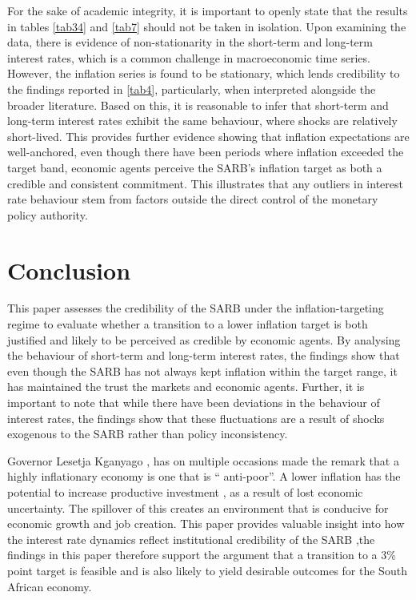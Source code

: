 \documentclass[11pt,preprint]{elsarticle}
\numberwithin{equation}{section}
\numberwithin{figure}{section}
\numberwithin{table}{section}
\begin{document}
For the sake of academic integrity, it is important to openly state that
the results in tables \ref{tab34} and \ref{tab7} should not be taken in
isolation. Upon examining the data, there is evidence of
non-stationarity in the short-term and long-term interest rates, which
is a common challenge in macroeconomic time series. However, the
inflation series is found to be stationary, which lends credibility to
the findings reported in \ref{tab4}, particularly, when interpreted
alongside the broader literature. Based on this, it is reasonable to
infer that short-term and long-term interest rates exhibit the same
behaviour, where shocks are relatively short-lived. This provides
further evidence showing that inflation expectations are well-anchored,
even though there have been periods where inflation exceeded the target
band, economic agents perceive the SARB's inflation target as both a
credible and consistent commitment. This illustrates that any outliers
in interest rate behaviour stem from factors outside the direct control
of the monetary policy authority.

\section{Conclusion}\label{conclusion}

This paper assesses the credibility of the SARB under the
inflation-targeting regime to evaluate whether a transition to a lower
inflation target is both justified and likely to be perceived as
credible by economic agents. By analysing the behaviour of short-term
and long-term interest rates, the findings show that even though the
SARB has not always kept inflation within the target range, it has
maintained the trust the markets and economic agents. Further, it is
important to note that while there have been deviations in the behaviour
of interest rates, the findings show that these fluctuations are a
result of shocks exogenous to the SARB rather than policy inconsistency.

Governor Lesetja Kganyago , has on multiple occasions made the remark
that a highly inflationary economy is one that is `` anti-poor''. A
lower inflation has the potential to increase productive investment , as
a result of lost economic uncertainty. The spillover of this creates an
environment that is conducive for economic growth and job creation. This
paper provides valuable insight into how the interest rate dynamics
reflect institutional credibility of the SARB ,the findings in this
paper therefore support the argument that a transition to a 3\% point
target is feasible and is also likely to yield desirable outcomes for
the South African economy.
\end{document}
